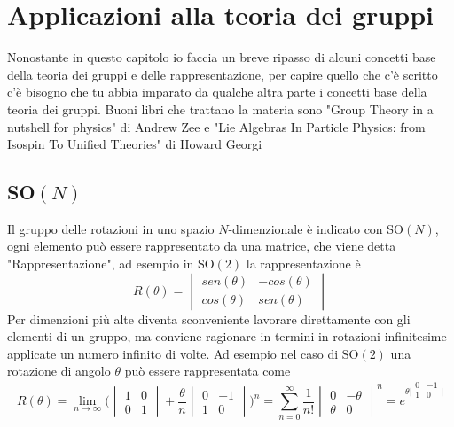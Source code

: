 \documentclass[11pt,a4paper]{report}
\theoremstyle{definition}
\theoremstyle{plain}
\theoremstyle{plain}
\begin{document}
	\chapter{Applicazioni alla teoria dei gruppi}
		Nonostante in questo capitolo io faccia un breve ripasso di alcuni concetti base della teoria dei gruppi e delle rappresentazione, per capire quello che c'è scritto c'è bisogno che tu abbia imparato da qualche altra parte i concetti base della teoria dei gruppi.\newline
		Buoni libri che trattano la materia sono "Group Theory in a nutshell for physics" di Andrew Zee e "Lie Algebras In Particle Physics: from Isospin To Unified Theories" di Howard Georgi
		\section{SO$(N)$}
			Il gruppo delle rotazioni in uno spazio $N$-dimenzionale è indicato con SO$(N)$, ogni elemento può essere rappresentato da una matrice, che viene detta "Rappresentazione", ad esempio in SO$(2)$ la rappresentazione è
			\[
				R(\theta)=
				\begin{vmatrix}
					sen(\theta) & -cos(\theta)\\
					cos(\theta) &  sen(\theta)
				\end{vmatrix}
			\]
			Per dimenzioni più alte diventa sconveniente lavorare direttamente con gli elementi di un gruppo, ma conviene ragionare in termini in rotazioni infinitesime applicate un numero infinito di volte.\newline
			Ad esempio nel caso di SO$(2)$ una rotazione di angolo $\theta$ può essere rappresentata come
			\begin{equation}
				R(\theta)=\lim_{n\to\infty}\Bigg(
				\begin{vmatrix}
					1 & 0\\
					0 & 1
				\end{vmatrix}+\frac{\theta}{n}
				\begin{vmatrix}
					0 & -1\\
					1 & 0
				\end{vmatrix}\Bigg)^n=
				\sum_{n=0}^{\infty}\frac{1}{n!}
				\begin{vmatrix}
					0 & -\theta\\
					\theta & 0
				\end{vmatrix}^n=
				e^{\theta\big|
				\begin{smallmatrix}
					0 & -1\\
					1 & 0 \\
				\end{smallmatrix}\big|}
			\end{equation}
\end{document}
